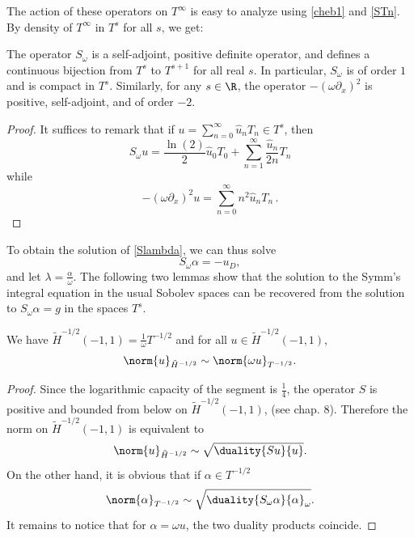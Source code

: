 \documentclass[a4paper]{article}
\begin{document}
	The action of these operators on $T^{\infty}$ is easy to analyze using \eqref{cheb1} and \autoref{STn}. By density of $T^{\infty}$ in $T^s$ for all $s$, we get:
	\begin{Prop}
		The operator $S_\omega$ is a self-adjoint, positive definite operator, and defines a continuous bijection from $T^{s}$ to $T^{s+1}$ for all real $s$. In particular, $S_\omega$ is of order $1$ and is compact in $T^s$. 
		Similarly, for any $s \in \R$, the operator $-(\omega \partial_x)^2$ is positive, self-adjoint, and of order $-2$. 
	\end{Prop}
	\begin{proof}
		It suffices to remark that if $u=\sum_{n=0}^\infty \hat{u}_n T_n \in T^s$, then
		\[S_\omega u = \frac{\ln(2)}{2} \hat{u}_0 T_0 +  \sum_{n=1}^\infty \frac{\hat{u}_n}{2n} T_n\]
		while
		\[-(\omega \partial_x)^2 u = \sum_{n=0}^\infty n^2\hat{u}_n T_n \,.\]
	\end{proof}
	\noindent To obtain the solution of \eqref{Slambda}, we can thus solve 
	\begin{equation}
		S_\omega \alpha = -u_D,
		\label{Somegaalpha}
	\end{equation}
	and let $\lambda = \frac{\alpha}{\omega}$.  
	The following two lemmas show that the solution to the Symm's integral equation in the usual Sobolev spaces can be recovered from the solution to $S_\omega \alpha = g$ in the spaces $T^s$. 
	\begin{Lem}
		\label{LemmaT-1/2}
		We have $\tilde{H}^{-1/2}(-1,1) = \frac{1}{\omega}T^{-1/2}$ and for all $u \in \tilde{H}^{-1/2}(-1,1)$,
		\[\norm{u}_{\tilde{H}^{-1/2}} \sim \norm{\omega u}_{T^{-1/2}}.\] 
	\end{Lem}
	
	\begin{proof}
		Since the logarithmic capacity of the segment is $\frac{1}{4}$, the operator $S$ is positive and bounded from below on $\tilde{H}^{-1/2}(-1,1)$, (see \cite{mclean2000strongly} chap. 8). Therefore the norm on $\tilde{H}^{-1/2}(-1,1)$ is equivalent to 
		\[\norm{u}_{\tilde{H}^{-1/2}} \sim \sqrt{\duality{Su}{u}}.\]
		On the other hand, it is obvious that if $\alpha\in T^{-1/2}$
		\[ \norm{\alpha}_{T^{-1/2}} \sim \sqrt{\duality{S_\omega \alpha}{\alpha}_\omega}.\]
		It remains to notice that for $\alpha=\omega u$, the two duality products coincide.
	\end{proof}
	
\end{document}
